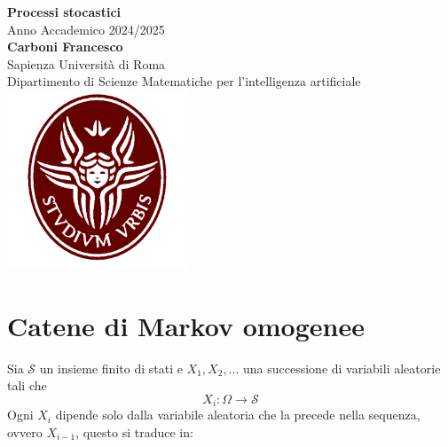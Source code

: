 \documentclass{article}
\theoremstyle{definition}
\theoremstyle{remark}
\begin{document}
\begin{titlepage}
    \centering
    \vspace*{1cm}
    
    {\Huge \textbf{Processi stocastici}} \\[1.5cm]
    
    {\Large Anno Accademico 2024/2025} \\[2cm]
    
    {\Large \textbf{Carboni Francesco}} \\[0.5cm]
    {\large Sapienza Università di Roma} \\
    {\large Dipartimento di Scienze Matematiche per l'intelligenza artificiale} \\[2cm]
    
   \includegraphics[width=0.4\textwidth]{../img/Stemma_sapienza.png} \\[2cm]
        
    \vfill
\end{titlepage}
\tableofcontents 
\newpage
\section{Catene di Markov omogenee}
Sia $\mathcal{S}$ un insieme finito di stati e $X_1,X_2,...$  una successione di variabili aleatorie tali che
    $$X_i:\Omega \to \mathcal{S}$$
Ogni $X_i$ dipende solo dalla variabile aleatoria che la precede nella sequenza, ovvero $X_{i-1}$, questo si traduce in:
\end{document}
